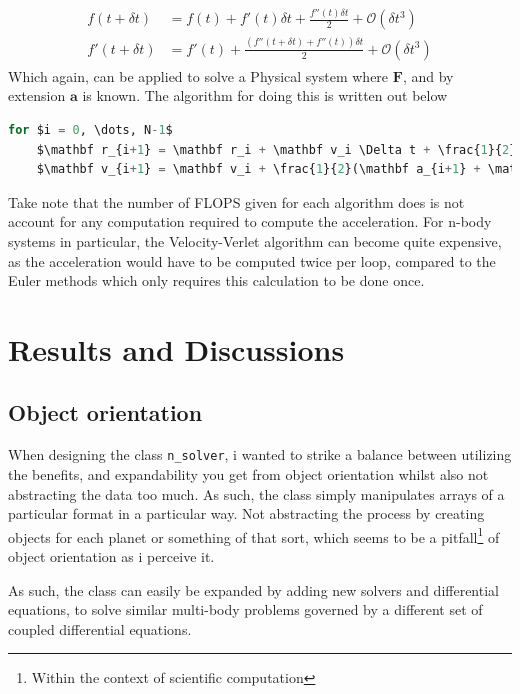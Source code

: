\documentclass[10pt,showpacs,preprintnumbers,amsmath,amssymb,nofootinbib,aps,prl,twocolumn,groupedaddress,superscriptaddress,showkeys]{revtex4-1}
\begin{document}
    \begin{align}
      \begin{split}
        f(t + \delta t) &= f(t) + f'(t)\delta t + \frac{f''(t)\delta t}{2} + \mathcal O(\delta t^3) \\
        f'(t + \delta t) &= f'(t) + \frac{\left( f''(t + \delta t) + f''(t) \right)\delta t}{2} + \mathcal O(\delta t^3)
      \end{split}
    \end{align}
    Which again, can be applied to solve a Physical system where $\mathbf F$, and by extension $\mathbf a$ is known. The algorithm for doing this is written out below
  \begin{lstlisting}[mathescape=true, language=python, title=Velocity-Verlet Algorithm (10N FLOPS)]
  for $i = 0, \dots, N-1$
    $\mathbf r_{i+1} = \mathbf r_i + \mathbf v_i \Delta t + \frac{1}{2}\mathbf a_i(\Delta t)^2$
    $\mathbf v_{i+1} = \mathbf v_i + \frac{1}{2}(\mathbf a_{i+1} + \mathbf a_i)\Delta t  $
  \end{lstlisting}

  Take note that the number of FLOPS given for each algorithm does is not account for any computation required to compute the acceleration. For n-body systems in particular, the Velocity-Verlet algorithm can become quite expensive, as the acceleration would have to be computed twice per loop, compared to the Euler methods which only requires this calculation to be done once.

\newpage

\section{Results and Discussions}
  \subsection{Object orientation}
    When designing the class \lstinline{n_solver}, i wanted to strike a balance between utilizing the benefits, and expandability you get from object orientation whilst also not abstracting the data too much. As such, the class simply manipulates arrays of a particular format in a particular way. Not abstracting the process by creating objects for each planet or something of that sort, which seems to be a pitfall\footnote{Within the context of scientific computation} of object orientation as i perceive it.

    As such, the class can easily be expanded by adding new solvers and differential equations, to solve similar multi-body problems governed by a different set of coupled differential equations.
\end{document}
